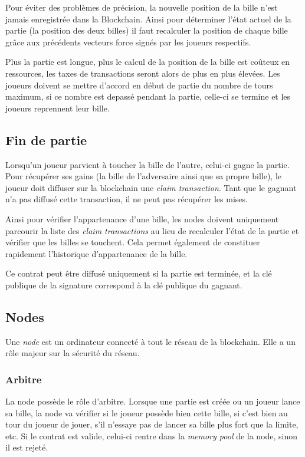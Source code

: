 \documentclass{article}
\begin{document}
Pour éviter des problèmes de précision, la nouvelle position de la bille n'est jamais enregistrée dans la Blockchain. Ainsi pour déterminer l'état actuel de la partie (la position des deux billes) il faut recalculer la position de chaque bille grâce aux précédents vecteurs force signés par les joueurs respectifs.

Plus la partie est longue, plus le calcul de la position de la bille est coûteux en ressources, les taxes de transactions seront alors de plus en plus élevées. Les joueurs doivent se mettre d'accord en début de partie du nombre de tours maximum, si ce nombre est depassé pendant la partie, celle-ci se termine et les joueurs reprennent leur bille.

\subsection{Fin de partie}
Lorsqu'un joueur parvient à toucher la bille de l'autre, celui-ci gagne la partie. Pour récupérer ses gains (la bille de l'adversaire ainsi que sa propre bille), le joueur doit diffuser sur la blockchain une \textit{claim transaction}. Tant que le gagnant n'a pas diffusé cette transaction, il ne peut pas récupérer les mises.

Ainsi pour vérifier l'appartenance d'une bille, les nodes doivent uniquement parcourir la liste des \textit{claim transactions} au lieu de recalculer l'état de la partie et vérifier que les billes se touchent. 
Cela permet également de constituer rapidement l'historique d'appartenance de la bille. 

Ce contrat peut être diffusé uniquement si la partie est terminée, et la clé publique de la signature correspond à la clé publique du gagnant.

\subsection{Nodes}
Une \textit{node} est un ordinateur connecté à tout le réseau de la blockchain. Elle a un rôle majeur sur la sécurité du réseau.

\subsubsection{Arbitre}
La node possède le rôle d'arbitre.
Lorsque une partie est créée ou un joueur lance sa bille, la node va vérifier si le joueur possède bien cette bille, si c'est bien au tour du joueur de jouer, s'il n'essaye pas de lancer sa bille plus fort que la limite, etc.
Si le contrat est valide, celui-ci rentre dans la \textit{memory pool} de la node, sinon il est rejeté.
\end{document}
